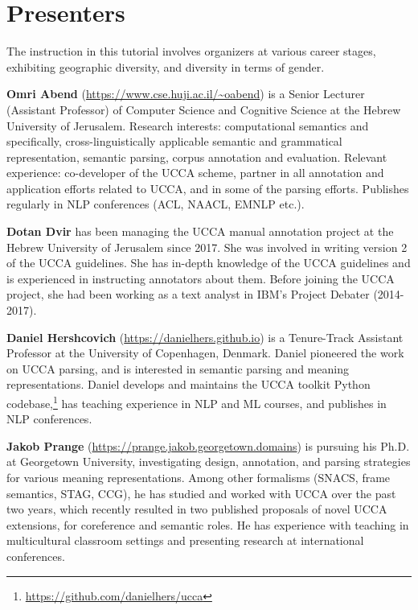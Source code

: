 \documentclass[11pt,a4paper,table]{article}
\begin{document}
\section{Presenters}\label{sec:instructors}

The instruction in this tutorial involves organizers at various
career stages, exhibiting geographic diversity, and diversity in terms of 
gender.

\textbf{Omri Abend} (\url{https://www.cse.huji.ac.il/~oabend})
is a Senior Lecturer (Assistant Professor) of Computer Science and Cognitive Science
at the Hebrew University of Jerusalem.
Research interests:
computational semantics and specifically, cross-linguistically applicable
semantic and grammatical representation, semantic parsing, corpus annotation and evaluation.
Relevant experience: co-developer of the UCCA scheme, partner in all annotation and application efforts related to UCCA, and in some of the parsing efforts. Publishes regularly in NLP conferences (ACL, NAACL, EMNLP etc.).

\textbf{Dotan Dvir} has been managing the UCCA manual annotation project at the Hebrew University of Jerusalem since 2017. She was involved in writing version 2 of the UCCA guidelines. She has in-depth knowledge of the UCCA guidelines and is experienced in instructing annotators about them. Before joining the UCCA project, she had been working as a text analyst in IBM's Project Debater (2014-2017).

\textbf{Daniel Hershcovich} (\url{https://danielhers.github.io})
is a Tenure-Track Assistant Professor at the University of Copenhagen, Denmark.
Daniel pioneered the work on UCCA parsing, and
is interested in semantic parsing and meaning representations.
Daniel develops and maintains the UCCA toolkit Python codebase,\footnote{\url{https://github.com/danielhers/ucca}}
has teaching experience in NLP and ML courses,
and publishes in NLP conferences.

\textbf{Jakob Prange} (\url{https://prange.jakob.georgetown.domains})
is pursuing his Ph.D. at Georgetown University, investigating design, annotation, and parsing strategies for various meaning representations.
Among other formalisms (SNACS, frame semantics, STAG, CCG), he has studied and worked with UCCA over the past two years, which recently resulted in two published proposals of novel UCCA extensions, for coreference and semantic roles.
He has experience with teaching in multicultural classroom settings and presenting research at international conferences.
\end{document}
